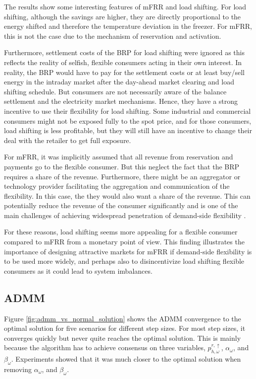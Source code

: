 The results show some interesting features of mFRR and load shifting. For load shifting, although the savings are higher, they are directly proportional to the energy shifted and therefore the temperature deviation in the freezer. For mFRR, this is not the case due to the mechanism of reservation and activation.

Furthermore, settlement costs of the BRP for load shifting were ignored as this reflects the reality of selfish, flexible consumers acting in their own interest. In reality, the BRP would have to pay for the settlement costs or at least buy/sell energy in the intraday market after the day-ahead market clearing and load shifting schedule. But consumers are not necessarily aware of the balance settlement and the electricity market mechanisms. Hence, they have a strong incentive to use their flexibility for load shifting. Some industrial and commercial consumers might not be exposed fully to the spot price, and for those consumers, load shifting is less profitable, but they will still have an incentive to change their deal with the retailer to get full exposure.

For mFRR, it was implicitly assumed that all revenue from reservation and payments go to the flexible consumer. But this neglect the fact that the BRP requires a share of the revenue. Furthermore, there might be an aggregator or technology provider facilitating the aggregation and communication of the flexibility. In this case, the they would also want a share of the revenue. This can potentially reduce the revenue of the consumer significantly and is one of the main challenges of achieving widespread penetration of demand-side flexibility \cite{gade2022ecosystem}.

For these reasons, load shifting seems more appealing for a flexible consumer compared to mFRR from a monetary point of view. This finding illustrates the importance of designing attractive markets for mFRR if demand-side flexibility is to be used more widely, and perhaps also to disincentivize load shifting flexible consumers as it could lead to system imbalances.


\subsection{ADMM}

Figure \ref{fig:admm_vs_normal_solution} shows the ADMM convergence to the optimal solution for five scenarios for different step sizes. For most step sizes, it converges quickly but never quite reaches the optimal solution. This is mainly because the algorithm has to achieve consensus on three variables, $p_{h,\omega}^{r,\uparrow}$, $\alpha_{\omega}$, and $\beta_{\omega}$. Experiments showed that it was much closer to the optimal solution when removing $\alpha_{\omega}$, and $\beta_{\omega}$.

